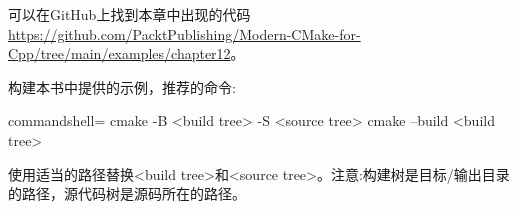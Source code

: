 可以在GitHub上找到本章中出现的代码 \url{https://github.com/PacktPublishing/Modern-CMake-for-Cpp/tree/main/examples/chapter12}。

构建本书中提供的示例，推荐的命令:

\begin{tcblisting}{commandshell={}}
cmake -B <build tree> -S <source tree>
cmake --build <build tree>
\end{tcblisting}

使用适当的路径替换<build tree>和<source tree>。注意:构建树是目标/输出目录的路径，源代码树是源码所在的路径。